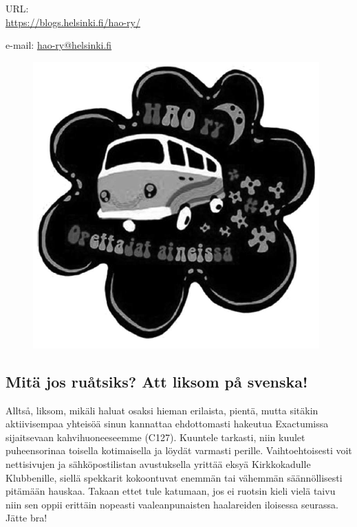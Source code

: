 \documentclass[a5paper, 8pt, twocolumn]{book} %
\numberwithin{equation}{section}
\begin{document}
\noindent URL: \\\url{https://blogs.helsinki.fi/hao-ry/}

\noindent e-mail: \url{hao-ry@helsinki.fi}

\begin{figure}[!b]
	\centering
	\includegraphics[width=0.8\columnwidth]{haologo.png}
\end{figure}

\subsection*{Mitä jos ruåtsiks? Att liksom på svenska!}
Alltså, liksom, mikäli haluat osaksi hieman
erilaista, pientä, mutta sitäkin aktiivisempaa
yhteisöä sinun kannattaa ehdottomasti
hakeutua Exactumissa sijaitsevaan
kahvihuoneeseemme (C127). Kuuntele
tarkasti, niin kuulet puheensorinaa toisella
kotimaisella ja löydät varmasti perille.
Vaihtoehtoisesti voit nettisivujen ja sähköpostilistan
avustuksella yrittää eksyä
Kirkkokadulle Klubbenille, siellä spekkarit
kokoontuvat enemmän tai vähemmän
säännöllisesti pitämään hauskaa. Takaan
ettet tule katumaan, jos ei ruotsin kieli vielä
taivu niin sen oppii erittäin nopeasti vaaleanpunaisten
haalareiden iloisessa seurassa.
Jätte bra!
\end{document}
